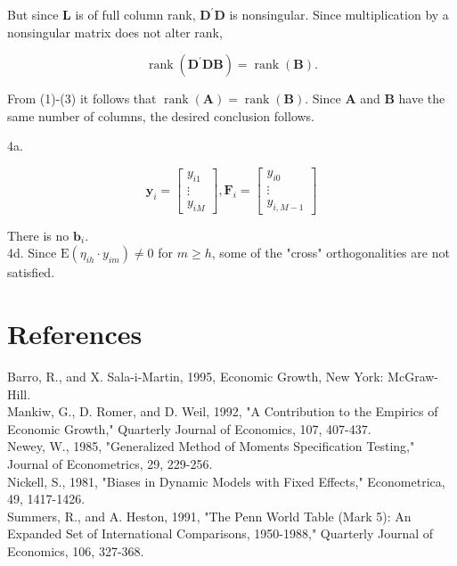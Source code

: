 \documentclass[10pt]{article}
\begin{document}
But since $\mathbf{L}$ is of full column rank, $\mathbf{D}^{\prime} \mathbf{D}$ is nonsingular. Since multiplication by a nonsingular matrix does not alter rank,


\begin{equation*}
\operatorname{rank}\left(\mathbf{D}^{\prime} \mathbf{D B}\right)=\operatorname{rank}(\mathbf{B}) . \tag{3}
\end{equation*}


From (1)-(3) it follows that $\operatorname{rank}(\mathbf{A})=\operatorname{rank}(\mathbf{B})$. Since $\mathbf{A}$ and $\mathbf{B}$ have the same number of columns, the desired conclusion follows.

4a.

$$
\mathbf{y}_{i}=\left[\begin{array}{c}
y_{i 1} \\
\vdots \\
y_{i M}
\end{array}\right], \mathbf{F}_{i}=\left[\begin{array}{c}
y_{i 0} \\
\vdots \\
y_{i, M-1}
\end{array}\right]
$$

There is no $\mathbf{b}_{i}$.\\
4d. Since $\mathrm{E}\left(\eta_{i h} \cdot y_{i m}\right) \neq 0$ for $m \geq h$, some of the "cross" orthogonalities are not satisfied.

\section*{References}
Barro, R., and X. Sala-i-Martin, 1995, Economic Growth, New York: McGraw-Hill.\\
Mankiw, G., D. Romer, and D. Weil, 1992, "A Contribution to the Empirics of Economic Growth," Quarterly Journal of Economics, 107, 407-437.\\
Newey, W., 1985, "Generalized Method of Moments Specification Testing," Journal of Econometrics, 29, 229-256.\\
Nickell, S., 1981, "Biases in Dynamic Models with Fixed Effects," Econometrica, 49, 1417-1426.\\
Summers, R., and A. Heston, 1991, "The Penn World Table (Mark 5): An Expanded Set of International Comparisons, 1950-1988," Quarterly Journal of Economics, 106, 327-368.
\end{document}

